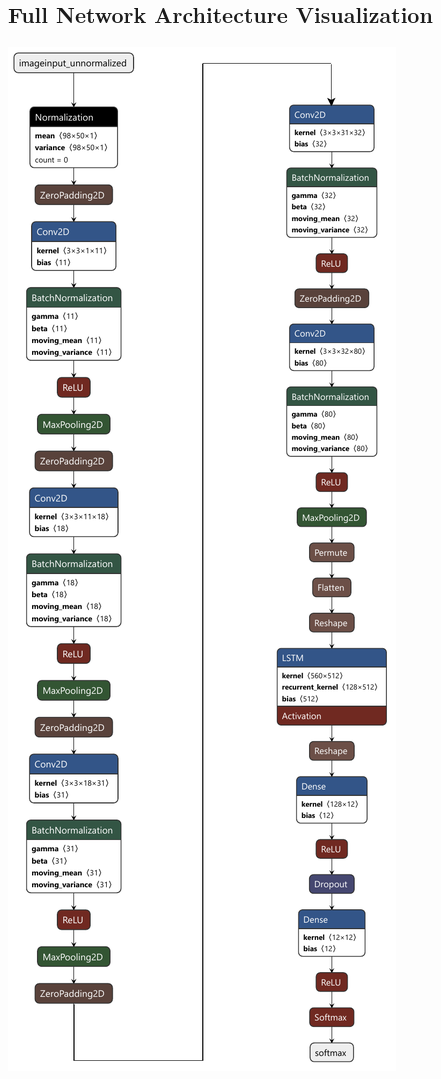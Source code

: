 \documentclass[a4paper]{report}
\begin{document}
{\subsection{Full Network Architecture Visualization}
       \begin{center}
        \includegraphics[width=0.6\linewidth]{netron1.pdf}
       \end{center}
}
\end{document}
